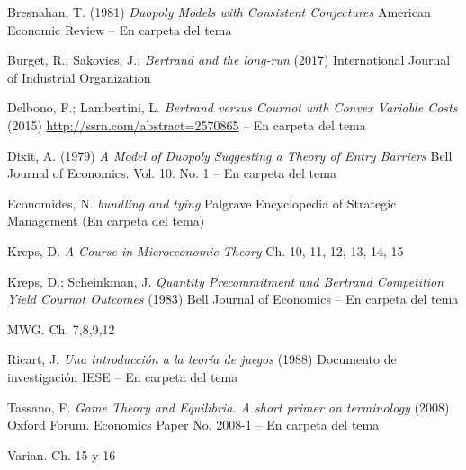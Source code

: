 \documentclass{nuevotema}
\begin{document}
Bresnahan, T. (1981) \textit{Duopoly Models with Consistent Conjectures} American Economic Review -- En carpeta del tema

Burget, R.; Sakovics, J.; \textit{Bertrand and the long-run} (2017) International Journal of Industrial Organization

Delbono, F.; Lambertini, L. \textit{Bertrand versus Cournot with Convex Variable Costs} (2015) \url{http://ssrn.com/abstract=2570865} -- En carpeta del tema

Dixit, A. (1979) \textit{A Model of Duopoly Suggesting a Theory of Entry Barriers} Bell Journal of Economics. Vol. 10. No. 1 -- En carpeta del tema

Economides, N. \textit{bundling and tying} Palgrave Encyclopedia of Strategic Management (En carpeta del tema)

Kreps, D. \textit{A Course in Microeconomic Theory} Ch. 10, 11, 12, 13, 14, 15

Kreps, D.; Scheinkman, J. \textit{Quantity Precommitment and Bertrand Competition Yield Cournot Outcomes} (1983) Bell Journal of Economics -- En carpeta del tema

MWG. Ch. 7,8,9,12

Ricart, J. \textit{Una introducción a la teoría de juegos} (1988) Documento de investigación IESE -- En carpeta del tema

Tassano, F. \textit{Game Theory and Equilibria. A short primer on terminology} (2008) Oxford Forum. Economics Paper No. 2008-1 -- En carpeta del tema

Varian. Ch. 15 y 16
\end{document}

